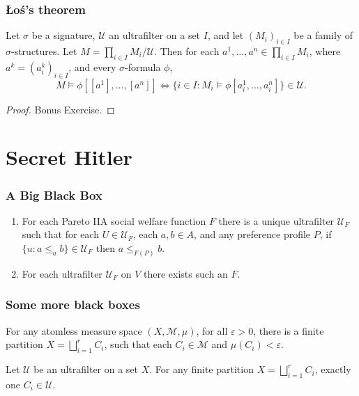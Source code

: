\documentclass{beamer}
\theoremstyle{definition}
\begin{document}
\begin{frame}
    \frametitle{Łoś's theorem}

    \pause
    \begin{theorem}
        Let $\sigma$ be a signature, $\mathcal{U}$ an ultrafilter on a set $I$, and let $(M_i)_{i \in I}$ be a family of $\sigma$-structures.
        Let $M = \prod_{i \in I} M_i / \mathcal{U}$. Then for each $a^1, \dots, a^n \in \prod_{i \in I} M_i$, where $a^k = (a^k_i)_{i \in I}$,
        and every $\sigma$-formula $\phi$,
        \pause
        \[
            M \models \phi[[a^1], \dots, [a^n]] \iff \{i \in I : M_i \models \phi[a_i^1, \dots, a_i^n]\} \in \mathcal{U}.
        \]
    \end{theorem}
    \pause
    \begin{proof}
        \pause
        Bonus Exercise.
    \end{proof}

\end{frame}

\section{Secret Hitler}

\begin{frame}
    \frametitle{A Big Black Box}

    \begin{theorem}
        \begin{enumerate}
            \pause
            \item For each Pareto IIA social welfare function $F$ there is a unique ultrafilter $\mathcal{U}_F$ such that for each $U \in \mathcal{U}_F$,
            each $a, b \in A$, and any preference profile $P$, if $\{u : a \leq_{u} b\} \in \mathcal{U}_F$ then $a \leq_{F(P)} b$.
            \pause
            \item For each ultrafilter $\mathcal{U}_F$ on $V$ there exists such an $F$.
        \end{enumerate}
    \end{theorem}

\end{frame}

\begin{frame}
    \frametitle{Some more black boxes}
    
    \pause
    \begin{fact}[Fact 1]
        For any atomless measure space $(X, \mathcal{M}, \mu)$, for all $\varepsilon > 0$, there is a finite partition $X = \bigsqcup_{i=1}^r C_i$,
        such that each $C_i \in \mathcal{M}$  and $\mu(C_i) < \varepsilon$.
    \end{fact}

    \pause
    \begin{fact}[Fact 2]
        Let $\mathcal{U}$ be an ultrafilter on a set $X$. For any finite partition $X = \bigsqcup_{i=1}^r C_i$, exactly one $C_i \in \mathcal{U}$.
    \end{fact}

\end{frame}
\end{document}
